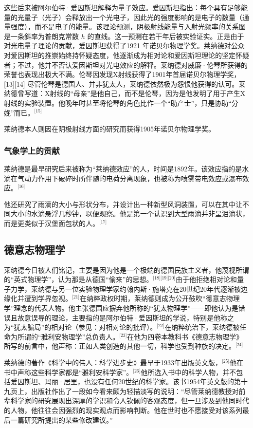 这些后来被阿尔伯特·爱因斯坦解释为量子效应。爱因斯坦指出：每个具有足够能量的光量子（光子）会释放出一个光电子，因此光的强度影响的是电子的数量（通量强度），而不是电子的能量。该理论预测，阴极射线能量与入射光频率的关系图是一条斜率为普朗克常数 $h$ 的直线。这一预测在若干年后被实验证实。正是由于对光电量子理论的贡献，爱因斯坦获得了1921 年诺贝尔物理学奖。莱纳德对公众对爱因斯坦的推崇始终持怀疑态度，他逐渐成为相对论和爱因斯坦理论的坚定怀疑者；不过，他并不否认爱因斯坦对光电效应的解释。莱纳德对威廉·伦琴所获得的荣誉也表现出极大不满。伦琴因发现X射线获得了1901年首届诺贝尔物理学奖，[13][14] 尽管伦琴是德国人、并非犹太人，莱纳德依然极为怨恨他获得的认可。莱纳德曾写道：X射线的“母亲”是他自己，而不是伦琴，因为是他发明了用于产生X射线的实验装置。他晚年时甚至将伦琴的角色比作一个“助产士”，只是协助“分娩”而已。\(^\text{[15]}\)

莱纳德本人则因在阴极射线方面的研究而获得1905年诺贝尔物理学奖。
\subsubsection{气象学上的贡献}
莱纳德是最早研究后来被称为“莱纳德效应”的人，时间是1892年。该效应指的是水滴在气动力作用下破碎时所伴随的电荷分离现象，也被称为喷雾带电效应或瀑布效应。\(^\text{[16]}\)

他还研究了雨滴的大小与形状分布，并设计出一种新型风洞装置，可以在其中让不同大小的水滴悬浮几秒钟，以便观察。他是第一个认识到大型雨滴并非呈泪滴状，而是更类似于汉堡面包状的人。\(^\text{[17]}\)
\subsection{德意志物理学}
莱纳德今日被人们铭记，主要是因为他是一个极端的德国民族主义者，他蔑视所谓的“英式物理学”，认为那是从德国“偷来”的思想。\(^\text{[18][19][20]}\)由于他拒绝相对论和量子力学，莱纳德与另一位实验物理学家约翰内斯·施塔克在20世纪20年代逐渐被边缘化并遭到学界忽视。\(^\text{[21]}\)在纳粹政权时期，莱纳德则成为公开鼓吹“德意志物理学”理念的代表人物。他主张德国应摒弃他所称的“犹太物理学”——即他认为是错误且故意误导的理论，主要指的是阿尔伯特·爱因斯坦的学说，特别是他称之为“犹太骗局”的相对论（参见：对相对论的批评）。\(^\text{[22]}\)在纳粹统治下，莱纳德被任命为所谓的“雅利安物理学”总负责人。\(^\text{[23]}\)在他为四卷本教科书《德意志物理学》所写的前言中，他声称：正如人类创造的其他一切，科学也受到种族的决定。\(^\text{[24]}\)

莱纳德的著作《科学中的伟人：科学进步史》最早于1933年出版英文版，\(^\text{[25]}\)他在书中声称这些科学家都是“雅利安科学家”。\(^\text{[26]}\)他所选入书中的科学人物，并不包括爱因斯坦、玛丽·居里，也没有任何20世纪的科学家。该书1954年英文版的第十九页上，出版社作出了一段如今看来颇为轻描淡写的说明：“尽管莱纳德教授对前辈科学家的研究展现出深厚的学识和令人钦佩的客观态度，但一旦涉及到他同时代的人物，他往往会因强烈的现实观点而影响判断。他在世时也不愿接受对该系列最后一篇研究所提出的某些修改建议。”

